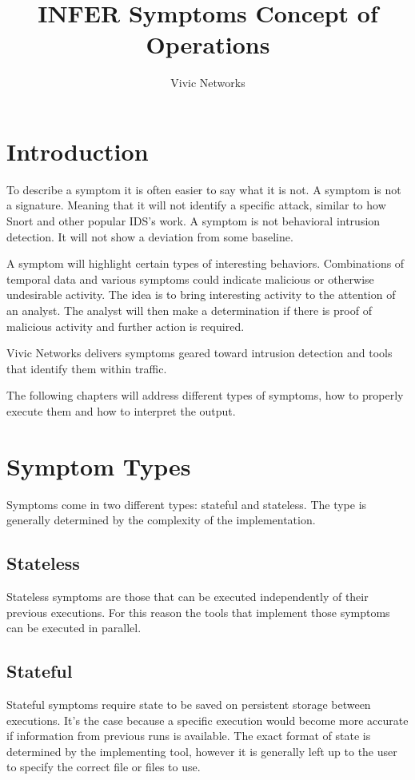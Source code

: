 \documentclass[titlepage,12pt]{report}
\title{INFER Symptoms Concept of Operations}
\author{Vivic Networks}
\begin{document}
\maketitle
\tableofcontents

\chapter{Introduction}
To describe a symptom it is often easier to say what it is not. A symptom is not a signature. Meaning that it will not identify a specific attack, similar to how Snort and other popular IDS's work. A symptom is not behavioral intrusion detection. It will not show a deviation from some baseline.

A symptom will highlight certain types of interesting behaviors. Combinations of temporal data and various symptoms could indicate malicious or otherwise undesirable activity. The idea is to bring interesting activity to the attention of an analyst. The analyst will then make a determination if there is proof of malicious activity and further action is required.

Vivic Networks delivers symptoms geared toward intrusion detection and tools that identify them within traffic.

The following chapters will address different types of symptoms, how to properly execute them and how to interpret the output.

\chapter{Symptom Types}
Symptoms come in two different types: stateful and stateless. The type is generally determined by the complexity of the implementation.

\section{Stateless}
Stateless symptoms are those that can be executed independently of their previous executions. For this reason the tools that implement those symptoms can be executed in parallel.

\section{Stateful}
Stateful symptoms require state to be saved on persistent storage between executions. It's the case because a specific execution would become more accurate if information from previous runs is available. The exact format of state is determined by the implementing tool, however it is generally left up to the user to specify the correct file or files to use.
\end{document}
